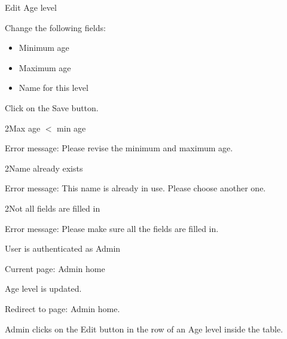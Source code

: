 
\begin{uc}{Edit Age level}

    \begin{uc-mss}
    \item Change the following fields:
    	\begin{itemize}
			\item Minimum age
			\item Maximum age
			\item Name for this level
		\end{itemize}
    \item Click on the Save button.
    \end{uc-mss}

    \begin{uc-ext}

				\begin{uc-fail}{2}{Max age $<$ min age}
				\item Error message: Please revise the minimum and maximum age.
				\end{uc-fail}

			  \begin{uc-fail}{2}{Name already exists}
				\item Error message: This name is already in use. Please choose another one.
				\end{uc-fail}

       \begin{uc-fail}{2}{Not all fields are filled in}
        \item Error message: Please make sure all the fields are filled in.
       \end{uc-fail}

    \end{uc-ext}

    \begin{uc-pre}
    \item User is authenticated as Admin
    \item Current page: Admin home
    \end{uc-pre}

    \begin{uc-post}
    \item Age level is updated.
    \item Redirect to page: Admin home.
    \end{uc-post}

    \begin{uc-trig}
        Admin clicks on the Edit button in the row of an Age level inside the table.
    \end{uc-trig}

\end{uc}
